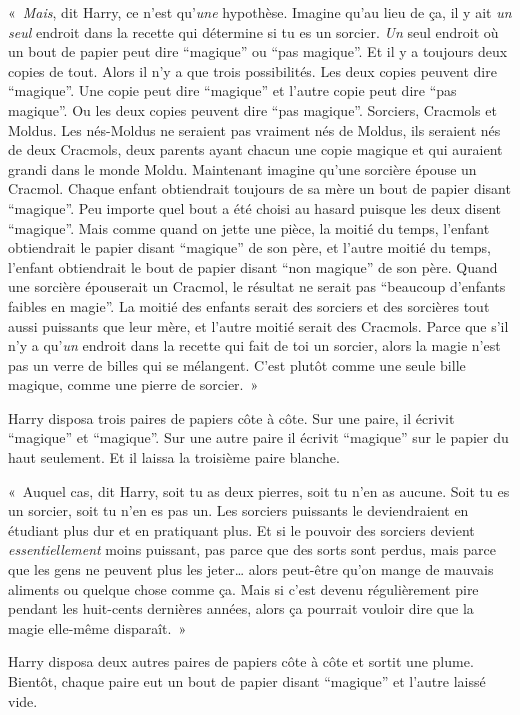 «~\emph{Mais}, dit Harry, ce n'est qu'\emph{une} hypothèse. Imagine qu'au lieu de ça, il y ait \emph{un seul} endroit dans la recette qui détermine si tu es un sorcier. \emph{Un} seul endroit où un bout de papier peut dire “magique” ou “pas magique”. Et il y a toujours deux copies de tout. Alors il n'y a que trois possibilités. Les deux copies peuvent dire “magique”. Une copie peut dire “magique” et l'autre copie peut dire “pas magique”. Ou les deux copies peuvent dire “pas magique”. Sorciers, Cracmols et Moldus. Les nés-Moldus ne seraient pas vraiment nés de Moldus, ils seraient nés de deux Cracmols, deux parents ayant chacun une copie magique et qui auraient grandi dans le monde Moldu. Maintenant imagine qu'une sorcière épouse un Cracmol. Chaque enfant obtiendrait toujours de sa mère un bout de papier disant “magique”. Peu importe quel bout a été choisi au hasard puisque les deux disent “magique”. Mais comme quand on jette une pièce, la moitié du temps, l'enfant obtiendrait le papier disant “magique” de son père, et l'autre moitié du temps, l'enfant obtiendrait le bout de papier disant “non magique” de son père. Quand une sorcière épouserait un Cracmol, le résultat ne serait pas “beaucoup d'enfants faibles en magie”. La moitié des enfants serait des sorciers et des sorcières tout aussi puissants que leur mère, et l'autre moitié serait des Cracmols. Parce que s'il n'y a qu'\emph{un} endroit dans la recette qui fait de toi un sorcier, alors la magie n'est pas un verre de billes qui se mélangent. C'est plutôt comme une seule bille magique, comme une pierre de sorcier.~»

Harry disposa trois paires de papiers côte à côte. Sur une paire, il écrivit “magique” et “magique”. Sur une autre paire il écrivit “magique” sur le papier du haut seulement. Et il laissa la troisième paire blanche.

«~Auquel cas, dit Harry, soit tu as deux pierres, soit tu n'en as aucune. Soit tu es un sorcier, soit tu n'en es pas un. Les sorciers puissants le deviendraient en étudiant plus dur et en pratiquant plus. Et si le pouvoir des sorciers devient \emph{essentiellement} moins puissant, pas parce que des sorts sont perdus, mais parce que les gens ne peuvent plus les jeter… alors peut-être qu'on mange de mauvais aliments ou quelque chose comme ça. Mais si c'est devenu régulièrement pire pendant les huit-cents dernières années, alors ça pourrait vouloir dire que la magie elle-même disparaît.~»

Harry disposa deux autres paires de papiers côte à côte et sortit une plume. Bientôt, chaque paire eut un bout de papier disant “magique” et l'autre laissé vide.

